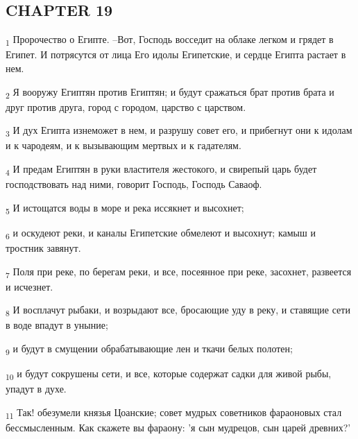 \subsection{CHAPTER 19}
\begin{tcolorbox}
\textsubscript{1} Пророчество о Египте. --Вот, Господь восседит на облаке легком и грядет в Египет. И потрясутся от лица Его идолы Египетские, и сердце Египта растает в нем.
\end{tcolorbox}
\begin{tcolorbox}
\textsubscript{2} Я вооружу Египтян против Египтян; и будут сражаться брат против брата и друг против друга, город с городом, царство с царством.
\end{tcolorbox}
\begin{tcolorbox}
\textsubscript{3} И дух Египта изнеможет в нем, и разрушу совет его, и прибегнут они к идолам и к чародеям, и к вызывающим мертвых и к гадателям.
\end{tcolorbox}
\begin{tcolorbox}
\textsubscript{4} И предам Египтян в руки властителя жестокого, и свирепый царь будет господствовать над ними, говорит Господь, Господь Саваоф.
\end{tcolorbox}
\begin{tcolorbox}
\textsubscript{5} И истощатся воды в море и река иссякнет и высохнет;
\end{tcolorbox}
\begin{tcolorbox}
\textsubscript{6} и оскудеют реки, и каналы Египетские обмелеют и высохнут; камыш и тростник завянут.
\end{tcolorbox}
\begin{tcolorbox}
\textsubscript{7} Поля при реке, по берегам реки, и все, посеянное при реке, засохнет, развеется и исчезнет.
\end{tcolorbox}
\begin{tcolorbox}
\textsubscript{8} И восплачут рыбаки, и возрыдают все, бросающие уду в реку, и ставящие сети в воде впадут в уныние;
\end{tcolorbox}
\begin{tcolorbox}
\textsubscript{9} и будут в смущении обрабатывающие лен и ткачи белых полотен;
\end{tcolorbox}
\begin{tcolorbox}
\textsubscript{10} и будут сокрушены сети, и все, которые содержат садки для живой рыбы, упадут в духе.
\end{tcolorbox}
\begin{tcolorbox}
\textsubscript{11} Так! обезумели князья Цоанские; совет мудрых советников фараоновых стал бессмысленным. Как скажете вы фараону: 'я сын мудрецов, сын царей древних?'
\end{tcolorbox}

